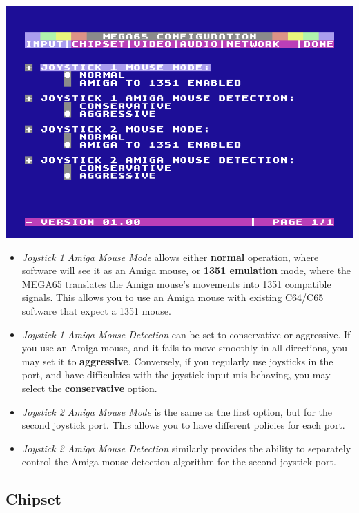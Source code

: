 \includegraphics[width=\linewidth]{images/ss-m65config-1.png}

\begin{itemize}
  \item{\em Joystick 1 Amiga Mouse Mode} allows either {\bf normal} operation,
    where software will see it as an Amiga mouse, or {\bf 1351
      emulation} mode, where the MEGA65 translates the Amiga mouse's
    movements into 1351 compatible signals. This allows you to use an
    Amiga mouse with existing C64/C65 software that expect a 1351
    mouse.
  \item{\em Joystick 1 Amiga Mouse Detection} can be set to conservative
    or aggressive.  If you use an Amiga mouse, and it fails to move
    smoothly in all directions, you may set it to {\bf
      aggressive}. Conversely, if you regularly use joysticks in the
    port, and have difficulties with the joystick input
    mis-behaving, you may select the {\bf conservative}
    option.
  \item{\em Joystick 2 Amiga Mouse Mode} is the same as the first
    option, but for the second joystick port. This allows you to
    have different policies for each port.
  \item{\em Joystick 2 Amiga Mouse Detection} similarly provides the
    ability to separately control the Amiga mouse detection
    algorithm for the second joystick port.
\end{itemize}


\subsection{Chipset}

